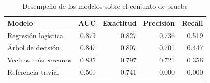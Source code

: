 \begin{table}[H]
\centering
\caption{Desempeño de los modelos sobre el conjunto de prueba}
\label{tab:resultados}
\small
\begin{tabular}{p{3.8cm} r r r r}
\toprule
\textbf{Modelo} & \textbf{AUC} & \textbf{Exactitud} & \textbf{Precisión} & \textbf{Recall} \\
\midrule
Regresión logística & 0.879 & 0.827 & 0.736 & 0.519 \\
Árbol de decisión & 0.847 & 0.807 & 0.701 & 0.447 \\
Vecinos más cercanos & 0.835 & 0.797 & 0.721 & 0.356 \\
Referencia trivial & 0.500 & 0.741 & 0.000 & 0.000 \\
\bottomrule
\end{tabular}
\end{table}
